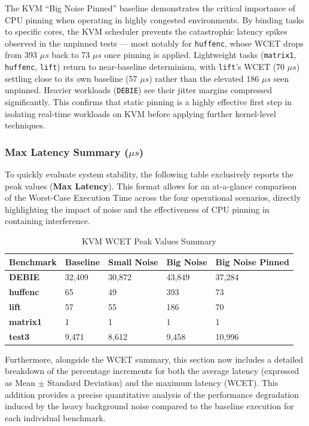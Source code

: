 The KVM ``Big Noise Pinned'' baseline demonstrates the critical
importance of CPU pinning when operating in highly congested
environments. By binding tasks to specific cores, the KVM scheduler
prevents the catastrophic latency spikes observed in the unpinned tests
--- most notably for \texttt{huffenc}, whose WCET drops from 393 $\mu s$ back
to 73 $\mu s$ once pinning is applied. Lightweight tasks (\texttt{matrix1},
\texttt{huffenc}, \texttt{lift}) return to near-baseline determinism,
with \texttt{lift}'s WCET (70 $\mu s$) settling close to its own baseline (57
$\mu s$) rather than the elevated 186 $\mu s$ seen unpinned. Heavier workloads
(\texttt{DEBIE}) see their jitter margins compressed significantly. This
confirms that static pinning is a highly effective first step in
isolating real-time workloads on KVM before applying further
kernel-level techniques.

\subsubsection{Max Latency Summary
($\mu s$)}\label{max-latency-summary-ux3bcs}

To quickly evaluate system stability, the following table exclusively
reports the peak values (\textbf{Max Latency}). This format allows for
an at-a-glance comparison of the Worst-Case Execution Time across the
four operational scenarios, directly highlighting the impact of noise
and the effectiveness of CPU pinning in containing interference.

\begin{table}
\centering
\caption{KVM WCET Peak Values Summary}
\label{tab:kvm:wcet-peak}
\begin{tabularx}{\linewidth}{@{}YYYYY@{}}
\toprule
Benchmark & Baseline & Small Noise & Big Noise & Big Noise Pinned\tabularnewline
\midrule
\textbf{DEBIE} & 32,409 & 30,872 & 43,849 & 37,284\tabularnewline
\textbf{huffenc} & 65 & 49 & 393 & 73\tabularnewline
\textbf{lift} & 57 & 55 & 186 & 70\tabularnewline
\textbf{matrix1} & 1 & 1 & 1 & 1\tabularnewline
\textbf{test3} & 9,471 & 8,612 & 9,458 & 10,996\tabularnewline
\bottomrule
\end{tabularx}
\end{table}

Furthermore, alongside the WCET summary, this section now includes a
detailed breakdown of the percentage increments for both the average
latency (expressed as Mean \(\pm\) Standard Deviation) and the maximum
latency (WCET). This addition provides a precise quantitative analysis
of the performance degradation induced by the heavy background noise
compared to the baseline execution for each individual benchmark.

